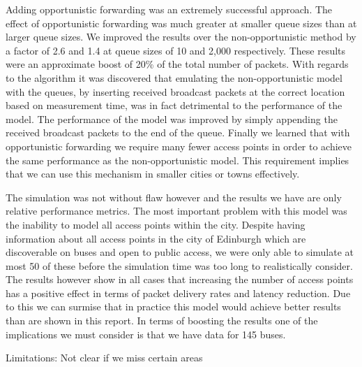 Adding opportunistic forwarding was an extremely successful approach. The effect of opportunistic forwarding was much greater at smaller queue sizes than at larger queue sizes. We improved the results over the non-opportunistic method by a factor of 2.6 and 1.4 at queue sizes of 10 and 2,000 respectively. These results were an approximate boost of 20\% of the total number of packets. With regards to the algorithm it was discovered that emulating the non-opportunistic model with the queues, by inserting received broadcast packets at the correct location based on measurement time, was in fact detrimental to the performance of the model. The performance of the model was improved by simply appending the received broadcast packets to the end of the queue. Finally we learned that with opportunistic forwarding we require many fewer access points in order to achieve the same performance as the non-opportunistic model. This requirement implies that we can use this mechanism in smaller cities or towns effectively. 

The simulation was not without flaw however and the results we have are only relative performance metrics. The most important problem with this model was the inability to model all access points within the city. Despite having information about all access points in the city of Edinburgh which are discoverable on buses and open to public access, we were only able to simulate at most 50 of these before the simulation time was too long to realistically consider. The results however show in all cases that increasing the number of access points has a positive effect in terms of packet delivery rates and latency reduction. Due to this we can surmise that in practice this model would achieve better results than are shown in this report. In terms of boosting the results one of the implications we must consider is that we have data for 145 buses. 


Limitations: Not clear if we miss certain areas
